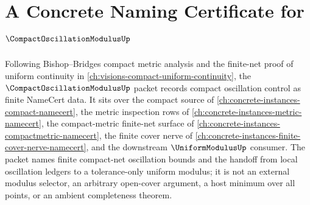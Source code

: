 \chapter{A Concrete Naming Certificate for $\CompactOscillationModulusUp$}
\label{ch:concrete-instances-compact-oscillation-modulus-namecert}

Following Bishop--Bridges compact metric analysis and the finite-net proof of uniform continuity in \autoref{ch:visions-compact-uniform-continuity}, the $\CompactOscillationModulusUp$ packet records compact oscillation control as finite NameCert data. It sits over the compact source of \autoref{ch:concrete-instances-compact-namecert}, the metric inspection rows of \autoref{ch:concrete-instances-metric-namecert}, the compact-metric finite-net surface of \autoref{ch:concrete-instances-compactmetric-namecert}, the finite cover nerve of \autoref{ch:concrete-instances-finite-cover-nerve-namecert}, and the downstream $\UniformModulusUp$ consumer. The packet names finite compact-net oscillation bounds and the handoff from local oscillation ledgers to a tolerance-only uniform modulus; it is not an external modulus selector, an arbitrary open-cover argument, a host minimum over all points, or an ambient completeness theorem.

